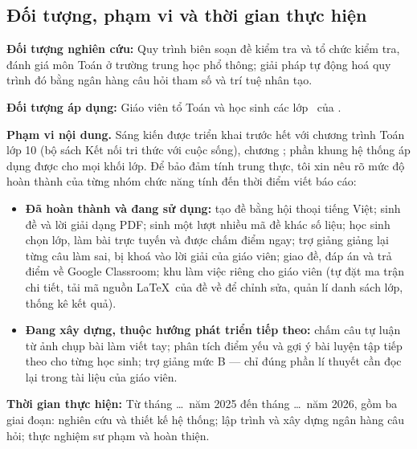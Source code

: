 \subsection{Đối tượng, phạm vi và thời gian thực hiện}

\textbf{Đối tượng nghiên cứu:} Quy trình biên soạn đề kiểm tra và tổ chức kiểm
tra, đánh giá môn Toán ở trường trung học phổ thông; giải pháp tự động hoá quy
trình đó bằng ngân hàng câu hỏi tham số và trí tuệ nhân tạo.

\textbf{Đối tượng áp dụng:} Giáo viên tổ Toán và học sinh các lớp \dotfill\ của
\DONVI.

\textbf{Phạm vi nội dung.} Sáng kiến được triển khai trước hết với chương trình
Toán lớp 10 (bộ sách Kết nối tri thức với cuộc sống), chương \dotfill; phần
khung hệ thống áp dụng được cho mọi khối lớp. Để bảo đảm tính trung thực, tôi
xin nêu rõ mức độ hoàn thành của từng nhóm chức năng tính đến thời điểm viết
báo cáo:

\begin{itemize}[leftmargin=1.2cm, itemsep=3pt]
  \item \textbf{Đã hoàn thành và đang sử dụng:} tạo đề bằng hội thoại tiếng
        Việt; sinh đề và lời giải dạng PDF; sinh một lượt nhiều mã đề khác số
        liệu; học sinh chọn lớp, làm bài trực tuyến và được chấm điểm ngay; trợ
        giảng giảng lại từng câu làm sai, bị khoá vào lời giải của giáo viên;
        giao đề, đáp án và trả điểm về Google Classroom; khu làm việc riêng cho
        giáo viên (tự đặt ma trận chi tiết, tải mã nguồn \LaTeX\ của đề về để
        chỉnh sửa, quản lí danh sách lớp, thống kê kết quả).
  \item \textbf{Đang xây dựng, thuộc hướng phát triển tiếp theo:} chấm câu tự
        luận từ ảnh chụp bài làm viết tay; phân tích điểm yếu và gợi ý bài
        luyện tập tiếp theo cho từng học sinh; trợ giảng mức B --- chỉ đúng
        phần lí thuyết cần đọc lại trong tài liệu của giáo viên.
\end{itemize}


\textbf{Thời gian thực hiện:} Từ tháng \dots\ năm 2025 đến tháng \dots\ năm
2026, gồm ba giai đoạn: nghiên cứu và thiết kế hệ thống; lập trình và xây dựng
ngân hàng câu hỏi; thực nghiệm sư phạm và hoàn thiện.

